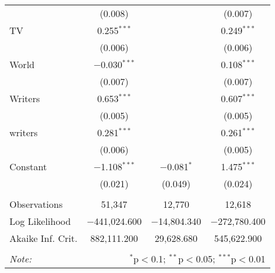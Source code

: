 \begin{table}[!htbp]
\begin{tabular}{@{\extracolsep{5pt}}lccc}
  & (0.008) &  & (0.007) \\ 
  TV & 0.255$^{***}$ &  & 0.249$^{***}$ \\ 
  & (0.006) &  & (0.006) \\ 
  World & $-$0.030$^{***}$ &  & 0.108$^{***}$ \\ 
  & (0.007) &  & (0.007) \\ 
  Writers & 0.653$^{***}$ &  & 0.607$^{***}$ \\ 
  & (0.005) &  & (0.005) \\ 
  writers & 0.281$^{***}$ &  & 0.261$^{***}$ \\ 
  & (0.006) &  & (0.005) \\ 
  Constant & $-$1.108$^{***}$ & $-$0.081$^{*}$ & 1.475$^{***}$ \\ 
  & (0.021) & (0.049) & (0.024) \\ 
 \hline \\[-1.8ex] 
Observations & 51,347 & 12,770 & 12,618 \\ 
Log Likelihood & $-$441,024.600 & $-$14,804.340 & $-$272,780.400 \\ 
Akaike Inf. Crit. & 882,111.200 & 29,628.680 & 545,622.900 \\ 
\hline 
\hline \\[-1.8ex] 
\textit{Note:}  & \multicolumn{3}{r}{$^{*}$p$<$0.1; $^{**}$p$<$0.05; $^{***}$p$<$0.01} \\ 
\end{tabular} 
\end{table} 
